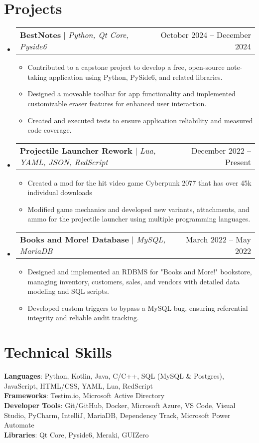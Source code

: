 \documentclass[letterpaper,11pt]{article}
\makeatletter
\newcommand{\resumeItem}[1]{
  \item\small{
    {#1 \vspace{-2pt}}
  }
}
\newcommand{\resumeProjectHeading}[2]{
    \item
    \begin{tabular*}{0.97\textwidth}{l@{\extracolsep{\fill}}r}
      \small#1 & #2 \\
    \end{tabular*}\vspace{-7pt}
}
\newcommand{\resumeSubHeadingListStart}{\begin{itemize}[leftmargin=0.15in, label={}]}
\newcommand{\resumeSubHeadingListEnd}{\end{itemize}}
\newcommand{\resumeItemListStart}{\begin{itemize}}
\newcommand{\resumeItemListEnd}{\end{itemize}\vspace{-5pt}}
\makeatother
\begin{document}
\section{Projects}
    \resumeSubHeadingListStart
      \resumeProjectHeading
          {\textbf{BestNotes} $|$ \emph{Python, Qt Core, Pyside6}}{October 2024 -- December 2024}
          \resumeItemListStart
            \resumeItem{Contributed to a capstone project to develop a free, open-source note-taking application using Python, PySide6, and related libraries.}
            \resumeItem{Designed a moveable toolbar for app functionality and implemented customizable eraser features for enhanced user interaction.}
            \resumeItem{Created and executed tests to ensure application reliability and measured code coverage.}
          \resumeItemListEnd
      \resumeProjectHeading
          {\textbf{Projectile Launcher Rework} $|$ \emph{Lua, YAML, JSON, RedScript}}{December 2022 -- Present}
          \resumeItemListStart
            \resumeItem{Created a mod for the hit video game Cyberpunk 2077 that has over 45k individual downloads}
            \resumeItem{Modified game mechanics and developed new variants, attachments, and ammo for the projectile launcher using multiple programming languages.}
          \resumeItemListEnd
      \resumeProjectHeading
          {\textbf{Books and More! Database} $|$ \emph{MySQL, MariaDB}}{March 2022 -- May 2022}
          \resumeItemListStart
            \resumeItem{Designed and implemented an RDBMS for "Books and More!" bookstore, managing inventory, customers, sales, and vendors with detailed data modeling and SQL scripts.}
            \resumeItem{Developed custom triggers to bypass a MySQL bug, ensuring referential integrity and reliable audit tracking.}
          \resumeItemListEnd
    \resumeSubHeadingListEnd



%
\section{Technical Skills}
 \begin{itemize}[leftmargin=0.15in, label={}]
    \small{\item{
     \textbf{Languages}{: Python, Kotlin, Java, C/C++, SQL (MySQL \& Postgres), JavaScript, HTML/CSS, YAML, Lua, RedScript} \\
     \textbf{Frameworks}{: Testim.io, Microsoft Active Directory} \\
     \textbf{Developer Tools}{: Git/GitHub, Docker, Microsoft Azure, VS Code, Visual Studio, PyCharm, IntelliJ, MariaDB, Dependency Track, Microsoft Power Automate} \\
     \textbf{Libraries}{: Qt Core, Pyside6, Meraki, GUIZero}
    }}
 \end{itemize}


\end{document}

